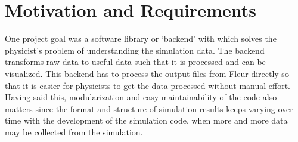 



\section{Motivation and Requirements}
\label{sec:motiv-requ}

One project goal was a software library or `backend' with which solves the
physicist's problem of understanding the simulation data. The backend transforms
raw data to useful data such that it is processed and can be visualized. This
backend has to process the output files from Fleur directly so that it is easier
for physicists to get the data processed without manual effort. Having said
this, modularization and easy maintainability of the code also matters since the
format and structure of simulation results keeps varying over time with the
development of the simulation code, when more and more data may be collected
from the simulation.

